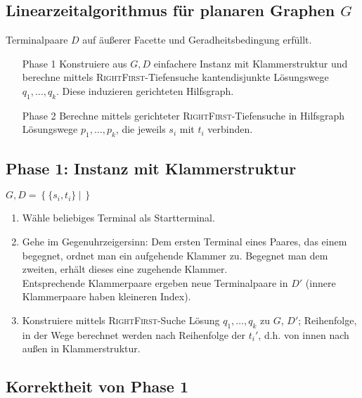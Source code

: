 \documentclass{article}
\newcommand{\set}[2]{\left\lbrace #1~|~#2 \right\rbrace}
\begin{document}
\subsection{Linearzeitalgorithmus für planaren Graphen $G$}
Terminalpaare $D$ auf äußerer Facette und Geradheitsbedingung erfüllt.\\

\begin{enumerate}
	\item[Phase 1] Konstruiere aus $G, D$ einfachere Instanz mit Klammerstruktur und berechne mittels \textsc{RightFirst}-Tiefensuche kantendisjunkte Lösungswege $q_1, \ldots, q_k$. Diese induzieren gerichteten Hilfsgraph.
	\item[Phase 2] Berechne mittels gerichteter \textsc{RightFirst}-Tiefensuche in Hilfsgraph Lösungswege $p_1,\ldots, p_k$, die jeweils $s_i$ mit $t_i$ verbinden.
\end{enumerate}

\subsection{Phase 1: Instanz mit Klammerstruktur}
$G, D = \set{\{s_i,t_i\}}{}$
\begin{enumerate}
	\item Wähle beliebiges Terminal als Startterminal.
	\item Gehe im Gegenuhrzeigersinn: Dem ersten Terminal eines Paares, das einem begegnet, ordnet man ein aufgehende Klammer zu. Begegnet man dem zweiten, erhält dieses eine zugehende Klammer.\\
	Entsprechende Klammerpaare ergeben neue Terminalpaare in $D'$ (innere Klammerpaare haben kleineren Index).
	\item Konstruiere mittels \textsc{RightFirst}-Suche Lösung $q_1,\ldots, q_k$ zu $G$, $D'$; Reihenfolge, in der Wege berechnet werden nach Reihenfolge der $t_i'$, d.h. von innen nach außen in Klammerstruktur.
\end{enumerate}

\subsection{Korrektheit von Phase 1}
\end{document}
